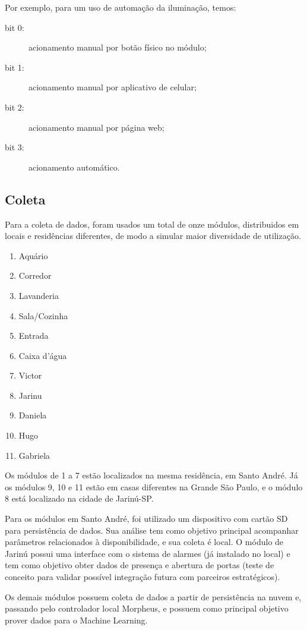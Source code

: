Por exemplo, para um uso de automação da iluminação, temos:

\begin{description}
	\item [bit 0:] acionamento manual por botão físico no módulo;
	\item [bit 1:] acionamento manual por aplicativo de celular;
	\item [bit 2:] acionamento manual por página web;
	\item [bit 3:] acionamento automático.
\end{description}

\subsection{Coleta}

Para a coleta de dados, foram usados um total de onze módulos, distribuidos em locais e residências diferentes, de modo a simular maior diversidade de utilização.

\begin{enumerate}
	\item Aquário
	\item Corredor
	\item Lavanderia
	\item Sala/Cozinha
	\item Entrada
	\item Caixa d’água
	\item Victor
	\item Jarinu
	\item Daniela
	\item Hugo
	\item Gabriela
\end{enumerate}

Os módulos de 1 a 7 estão localizados na mesma residência, em Santo André. Já os módulos 9, 10 e 11 estão em casas diferentes na Grande São Paulo, e o módulo 8 está localizado na cidade de Jarinú-SP.

Para os módulos em Santo André, foi utilizado um dispositivo com cartão SD para persistência de dados. Sua análise tem como objetivo principal acompanhar parâmetros relacionados à disponibilidade, e sua coleta é local. O módulo de Jarinú possui uma interface com o sistema de alarmes (já instalado no local) e tem como objetivo obter dados de presença e abertura de portas (teste de conceito para validar possível integração futura com parceiros estratégicos).

Os demais módulos possuem coleta de dados a partir de persistência na nuvem e, passando pelo controlador local Morpheus, e possuem como principal objetivo prover dados para o Machine Learning.

